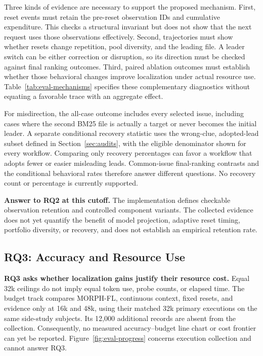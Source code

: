 \documentclass[letterpaper,journal]{IEEEtran}
\begin{document}
Three kinds of evidence are necessary to support the proposed mechanism. First, reset events must retain the pre-reset observation IDs and cumulative expenditure. This checks a structural invariant but does not show that the next request uses those observations effectively. Second, trajectories must show whether resets change repetition, pool diversity, and the leading file. A leader switch can be either correction or disruption, so its direction must be checked against final ranking outcomes. Third, paired ablation outcomes must establish whether those behavioral changes improve localization under actual resource use. Table~\ref{tab:eval-mechanisms} specifies these complementary diagnostics without equating a favorable trace with an aggregate effect.

For misdirection, the all-case outcome includes every selected issue, including cases where the second BM25 file is actually a target or never becomes the initial leader. A separate conditional recovery statistic uses the wrong-clue, adopted-lead subset defined in Section~\ref{sec:audits}, with the eligible denominator shown for every workflow. Comparing only recovery percentages can favor a workflow that adopts fewer or easier misleading leads. Common-issue final-ranking contrasts and the conditional behavioral rates therefore answer different questions. No recovery count or percentage is currently supported.

\noindent\textbf{Answer to RQ2 at this cutoff.} The implementation defines checkable observation retention and controlled component variants. The collected evidence does not yet quantify the benefit of model projection, adaptive reset timing, portfolio diversity, or recovery, and does not establish an empirical retention rate.

\subsection{RQ3: Accuracy and Resource Use}\label{sec:rq3}
\textbf{RQ3 asks whether localization gains justify their resource cost.} Equal 32k ceilings do not imply equal token use, probe counts, or elapsed time. The budget track compares MORPH-FL, continuous context, fixed resets, and evidence only at 16k and 48k, using their matched 32k primary executions on the same side-study subjects. Its 12,000 additional records are absent from the collection. Consequently, no measured accuracy--budget line chart or cost frontier can yet be reported. Figure~\ref{fig:eval-progress} concerns execution collection and cannot answer RQ3.
\end{document}
